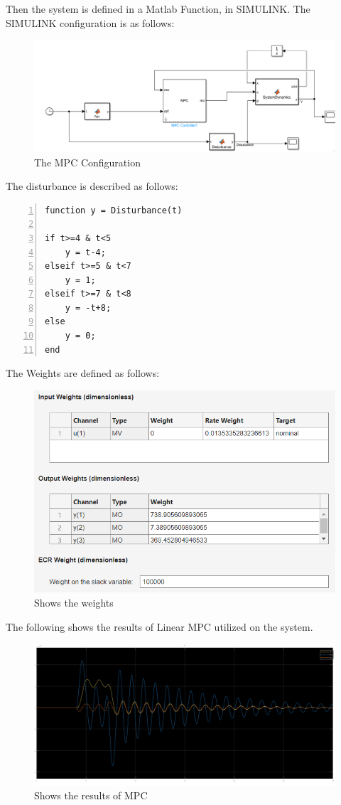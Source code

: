 \documentclass{article}
\begin{document}
Then the system is defined in a Matlab Function, in SIMULINK. The SIMULINK configuration is as follows:

\begin{figure}
    \centering
    \includegraphics[width=\linewidth]{images/Linear_MPC_Configuration.png}
    \caption{The MPC Configuration}
    \label{fig:enter-label2}
\end{figure}

The disturbance is described as follows:

\begin{lstlisting}[frame=single, numbers=left, style=Matlab-Pyglike]
function y = Disturbance(t)

if t>=4 & t<5 
    y = t-4;
elseif t>=5 & t<7
    y = 1;
elseif t>=7 & t<8
    y = -t+8;
else 
    y = 0;
end

\end{lstlisting}

The Weights are defined as follows: 

\begin{figure}
    \centering
    \includegraphics[width=0.5\linewidth]{images/Weights.png}
    \caption{Shows the weights}
    \label{fig:enter-label3}
\end{figure}

The following shows the results of Linear MPC utilized on the system.

\begin{figure}
    \centering
    \includegraphics[width=\linewidth]{images/MPC_Results.png}
    \caption{Shows the results of MPC}
    \label{fig:enter-label4}
\end{figure}
\end{document}
